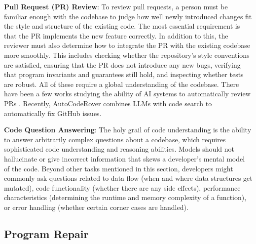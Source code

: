 \textbf{Pull Request (PR) Review}: To review pull requests, a person must be familiar enough with the codebase to judge how well newly introduced changes fit the style and structure of the existing code. The most essential requirement is that the PR implements the new feature correctly. In addition to this, the reviewer must also determine how to integrate the PR with the existing codebase more smoothly. This includes checking whether the repository's style conventions are satisfied, ensuring that the PR does not introduce any new bugs, verifying that program invariants and guarantees still hold, and inspecting whether tests are robust. All of these require a global understanding of the codebase. There have been a few works studying the ability of AI systems to automatically review PRs \citep{tufano2021towards, tufano2022using, li2022automating, li2024utilizing}. Recently, AutoCodeRover \citep{zhang2024autocoderover} combines LLMs with code search to automatically fix GitHub issues.


\textbf{Code Question Answering}: The holy grail of code understanding is the ability to answer arbitrarily complex questions about a codebase, which requires sophisticated code understanding and reasoning abilities. Models should not hallucinate or give incorrect information that skews a developer's mental model of the code. Beyond other tasks mentioned in this section, developers might commonly ask questions related to data flow (when and where data structures get mutated), code functionality (whether there are any side effects), performance characteristics (determining the runtime and memory complexity of a function), or error handling (whether certain corner cases are handled). 


\subsection{Program Repair}




